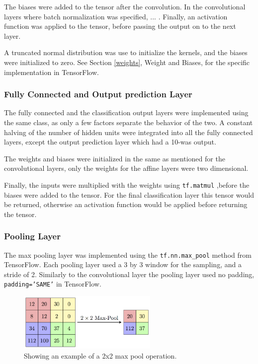 \documentclass[]{article}
\begin{document}
The biases were added to the tensor after the convolution. In the convolutional layers where batch normalization was specified, ... . Finally, an activation function was applied to the tensor, before passing the output on to the next layer. 

A truncated normal distribution was use to initialize the kernels, and the biases were initialized to zero. See Section \ref{weights}, Weight and Biases, for the specific implementation in TensorFlow. 

\subsubsection{Fully Connected and Output prediction Layer}

The fully connected and the classification output layers were implemented using the same class, as only a few factors separate the behavior of the two. A constant halving of the number of hidden units were integrated into all the fully connected layers, except the output prediction layer which had a 10-was output.

The weights and biases were initialized in the same as mentioned for the convolutional layers, only the weights for the affine layers were two dimensional. 

Finally, the inputs were multiplied with the weights using \texttt{tf.matmul} ,before the biases were added to the tensor. For the final classification layer this tensor would be returned, otherwise an activation function would be applied before returning the tensor.

\subsubsection{Pooling Layer}

The max pooling layer was implemented using the \texttt{tf.nn.max\_pool} method from TensorFlow. Each pooling layer used a 3 by 3 window for the sampling, and a stride of 2. Similarly to the convolutional layer the pooling layer used no padding, \texttt{padding='SAME'} in TensorFlow. 

\begin{figure}[h]
	\centering
	\includegraphics[width=0.6\textwidth]{pool}
	\caption{Showing an example of a 2x2 max pool operation.}
	\label{pool}
	\centering
\end{figure}
\end{document}
